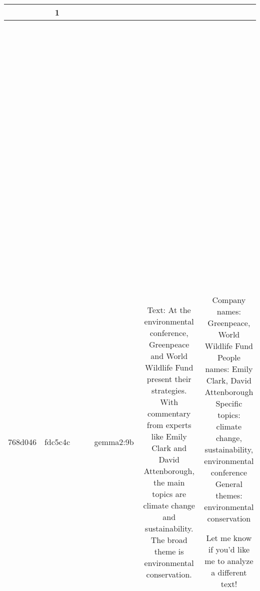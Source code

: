 \begin{table}[h!]
\begin{tabular}{|c|c|c|c|c|c|c|c|c|c|}
{OK & 1\\
\hline
768d046 & fdc5c4c &  &  & gemma2:9b & Text: At the environmental conference, Greenpeace and World Wildlife Fund present their strategies. With commentary from experts like Emily Clark and David Attenborough, the main topics are climate change and sustainability. The broad theme is environmental conservation. & Company names: Greenpeace, World Wildlife Fund 
People names: Emily Clark, David Attenborough
Specific topics: climate change, sustainability, environmental conference
General themes: environmental conservation  


Let me know if you'd like me to analyze a different text! 
 & err & The chatbot's output provides information extracted in the desired format specified in the description. It breaks down the entities into sections: Company names, People names, Specific topics, and General themes, using comma-separated lists where appropriate. Each section title is followed by a colon and the extracted information. However, the description requires that the output follows the format with only extractions and not include any additional commentary or invitations for further interaction. The additional line, "Let me know if you'd like me to analyze a different text!" does not comply with the described format of output, which makes it a violation.

ERR & 1\\
\hline
6376c23 & fdc5c4c &  &  & llama3.2:1b & Text: The lecture on digital transformation, attended by Facebook and Twitter representatives, was led by Mark Zuckerberg and Jack Dorsey. Key topics include social media trends and data analytics. The general theme is technology in society. & Here's the extracted information:

**Company names:** Facebook <br> Twitter
**People names:** 
- Mark Zuckerberg <br> Jack Dorsey
**Specific topics:** Social media trends, Data analytics
**General themes:** Technology in society & err & The chatbot output is formatted to extract and list the important entities and themes from a given text. However, the output does not strictly adhere to the desired format specified in the description:

1. **Company names**: The output provides a list of company names, but they are separated by line breaks instead of a comma-separated list as required by the desired format.
   
2. **People names**: The output correctly provides a list of people names, but they are on separate lines rather than in a comma-separated list as specified.

}
\end{tabular}
\end{table}
